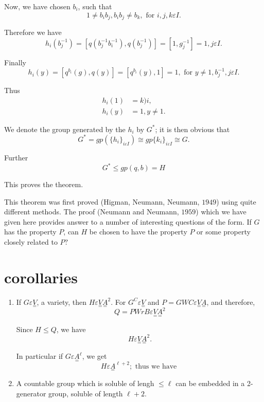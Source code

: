 Now, we have chosen $b_i$, such that 
$$
1 \neq b_i b_j, b_i b_j \neq b_k, \text{ for } i,j,k \varepsilon I.
$$

Therefore we have
$$
h_i (b_j^{-1}) = [q (b_j^{-1} b_i^{-1}), q(b_j^{-1})] = [1,g_j^{-1}] =
1, j \varepsilon I. 
$$

Finally
$$
h_i (y) = [q^{b_i} (g), q (y)] = [q^{b_i} (y), 1] = 1, \text{ for } y
\neq 1, b_j ^{-1}, j \varepsilon I. 
$$

Thus
\begin{align*}
  h_i (1) & = k)i,\\
  h_i (y) & = 1, y \neq 1.
\end{align*}
 
 We denote the group generated by the $h_i$ by $G^*$; it is then obvious that
 $$
 G^* = gp (\{ h_i\}_{i \varepsilon I}) \cong gp \{k_i\}_{i \varepsilon I} \cong G.
 $$
 
 Further
 $$
 G^* \le gp (q,b) = H
 $$
 
 This proves the theorem.
 
 This theorem was first proved (Higman, Neumann, Neumann, $1949$)
 using quite different methods. The proof (Neumann and Neumann,
 $1959$) which we have given here provides answer to a number of
 interesting questions of the form. If $G$ has the property $P$, can
 $H$ be chosen to have the property $P$ or some property closely
 related to $P ?$  
 
 \section{corollaries}%

 \begin{enumerate}
 \item If $G \varepsilon \underset{=}{V}$, a variety, then $H
   \varepsilon \underset{=}{V} \underset{=}{A}^2$. For $G^C
   \varepsilon \underset{=}{V}$ and $P = G W C \varepsilon
   \underset{=}{V} \underset{=}{A}$, and therefore, 
   $$
   Q = P Wr B \varepsilon \underset{=}{V} \underset{=}{A}^2
   $$

   Since $H \le Q$, we have
   $$
   H \varepsilon \underset{=}{V} \underset{=}{A}^2.
   $$
   
   In particular if $G \varepsilon \underset{=}{A}^\ell$, we get
   $$
   H \varepsilon \underset{=}{A}^{\ell + 2}; \text { thus we have }
   $$
 \item A countable group which is soluble of lengh $\le \ell$ can be
   embedded in a 2-generator group, soluble of length $\ell + 2$. 
 \end{enumerate}
 
